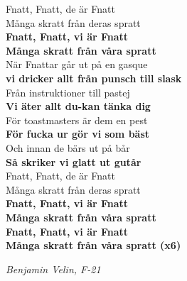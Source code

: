\documentclass[a6paper,10pt]{article}
\begin{document}
Fnatt, Fnatt, de är Fnatt\\
Många skratt från deras spratt\\
\textbf{Fnatt, Fnatt, vi är Fnatt}\\
\textbf{Många skratt från våra spratt}
\vspace{5pt}\\
När Fnattar går ut på en gasque\\
\textbf{vi dricker allt från punsch till slask}
\vspace{5pt}\\
Från instruktioner till pastej\\
\textbf{Vi äter allt du-kan tänka dig}
\vspace{5pt}\\
För toastmasters är dem en pest\\
\textbf{För fucka ur gör vi som bäst}
\vspace{5pt}\\
Och innan de bärs ut på bår\\
\textbf{Så skriker vi glatt ut gutår}
\vspace{5pt}\\
Fnatt, Fnatt, de är Fnatt\\
Många skratt från deras spratt\\
\textbf{Fnatt, Fnatt, vi är Fnatt}\\
\textbf{Många skratt från våra spratt}
\vspace{5pt}\\
\textbf{Fnatt, Fnatt, vi är Fnatt}\\
\textbf{Många skratt från våra spratt (x6)}\\

\begin{flushright}
\textit{Benjamin Velin, F-21}
\end{flushright}

\setlength{\oddsidemargin}{-0.47in}
\end{document}
